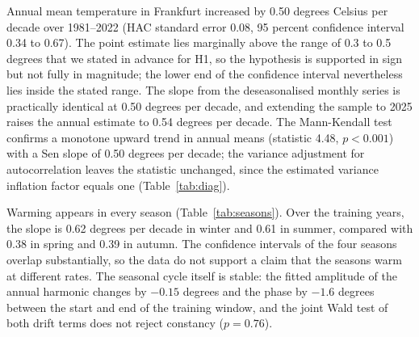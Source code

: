 Annual mean temperature in Frankfurt increased by 0.50 degrees Celsius per decade over 1981--2022 (HAC standard error 0.08, 95 percent confidence interval 0.34 to 0.67).
The point estimate lies marginally above the range of 0.3 to 0.5 degrees that we stated in advance for H1, so the hypothesis is supported in sign but not fully in magnitude; the lower end of the confidence interval nevertheless lies inside the stated range. The slope from the deseasonalised monthly series is practically identical at 0.50 degrees per decade, and extending the sample to 2025 raises the annual estimate to 0.54 degrees per decade.
The Mann-Kendall test confirms a monotone upward trend in annual means (statistic 4.48, $p<0.001$) with a Sen slope of 0.50 degrees per decade; the variance adjustment for autocorrelation leaves the statistic unchanged, since the estimated variance inflation factor equals one (Table~\ref{tab:diag}).

Warming appears in every season (Table~\ref{tab:seasons}). Over the training years, the slope is 0.62 degrees per decade in winter and 0.61 in summer, compared with 0.38 in spring and 0.39 in autumn.
The confidence intervals of the four seasons overlap substantially, so the data do not support a claim that the seasons warm at different rates. The seasonal cycle itself is stable: the fitted amplitude of the annual harmonic changes by $-0.15$ degrees and the phase by $-1.6$ degrees between the start and end of the training window, and the joint Wald test of both drift terms does not reject constancy ($p=0.76$).

